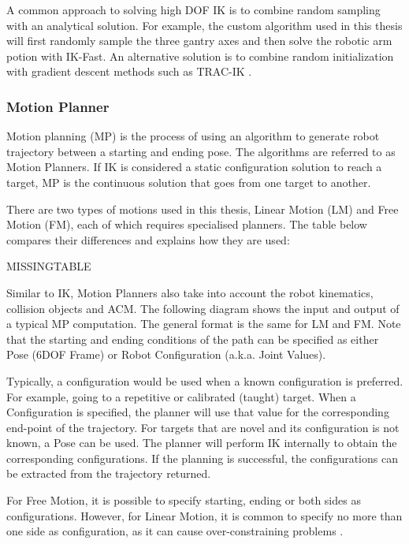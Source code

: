 A common approach to solving high DOF IK is to combine random sampling with an analytical solution. For example, the custom algorithm used in this thesis will first randomly sample the three gantry axes and then solve the robotic arm potion with IK-Fast. An alternative solution is to combine random initialization with gradient descent methods such as TRAC-IK \parencite{beesonTRACIKOpensourceLibrary2015}. 

\subsubsection{Motion Planner}
\label{subsubsection:exploration-2-motion-planner}

Motion planning (MP) is the process of using an algorithm to generate robot trajectory between a starting and ending pose. The algorithms are referred to as Motion Planners.  If IK is considered a static configuration solution to reach a target, MP is the continuous solution that goes from one target to another. 

There are two types of motions used in this thesis, Linear Motion (LM) and Free Motion (FM), each of which requires specialised planners. The table below compares their differences and explains how they are used: 


MISSINGTABLE

Similar to IK, Motion Planners also take into account the robot kinematics, collision objects and ACM. The following diagram shows the input and output of a typical MP computation. The general format is the same for LM and FM. Note that the starting and ending conditions of the path can be specified as either Pose (6DOF Frame) or Robot Configuration (a.k.a. Joint Values). 

Typically, a configuration would be used when a known configuration is preferred. For example, going to a repetitive or calibrated (taught) target. When a Configuration is specified, the planner will use that value for the corresponding end-point of the trajectory. For targets that are novel and its configuration is not known, a Pose can be used. The planner will perform IK internally to obtain the corresponding configurations. If the planning is successful, the configurations can be extracted from the trajectory returned.

For Free Motion, it is possible to specify starting, ending or both sides as configurations. However, for Linear Motion, it is common to specify no more than one side as configuration, as it can cause over-constraining problems \parencite{berensonTaskSpaceRegions2011}.

